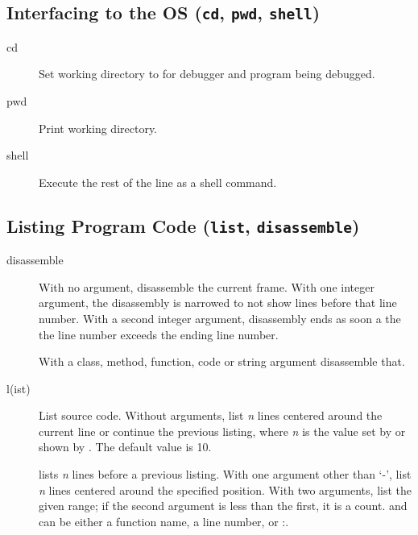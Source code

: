 \subsection{Interfacing to the OS ({\tt cd}, {\tt pwd},
  {\tt shell})\label{subsection-os}}

\begin{description}

\item[cd ]\label{command:cd}

Set working directory to  for debugger and program
being debugged.

\item[pwd]\label{command:pwd}

Print working directory.  

\item[shell ]\label{command:shell}

Execute the rest of the line as a shell command.


\end{description}

\subsection{Listing Program Code ({\tt list}, {\tt disassemble})\label{subsection-listing}}

\begin{description}

\item[disassemble  ]

With no argument, disassemble the current frame.  With one integer
argument, the disassembly is narrowed to not show lines before that
line number. With a second integer argument, disassembly ends as soon
a the the line number exceeds the ending line number.

With a class, method, function, code or string argument disassemble
that.

\item[l(ist) ]\label{command:list}

List source code.  Without arguments, list
\emph{n} lines centered around the current line or continue the previous
listing, where \emph{n} is the value set by  or
shown by .  The default value is 10.

 lists \emph{n} lines before a previous listing. With one
argument other than `-', list \emph{n} lines centered around the
specified position.  With two arguments, list the given range; if the
second argument is less than the first, it is a count.  and
 can be either a function name, a line number, or
:.

\end{description}

